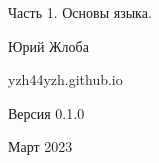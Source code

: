 
\begin{titlepage}

\centering


\vspace{30pt}

\huge{Часть 1. Основы языка.}

\vspace{35pt}

\large{Юрий Жлоба}

\vspace{280pt}

\small{yzh44yzh.github.io}

\vspace{30pt}

\small{Версия 0.1.0}

\small{Март 2023}

\end{titlepage}

\ClearShipoutPictureBG
